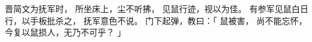 
\switchcolumn*[\section{}]

晋简文为抚军时，
所坐床上，尘不听拂，
见鼠行迹，视以为佳。
有参军见鼠白日行，以手板批杀之，
抚军意色不说。
门下起弹，教曰：「
    鼠被害，
    尚不能忘怀，
    今复以鼠损人，无乃不可乎？
」

\switchcolumn



